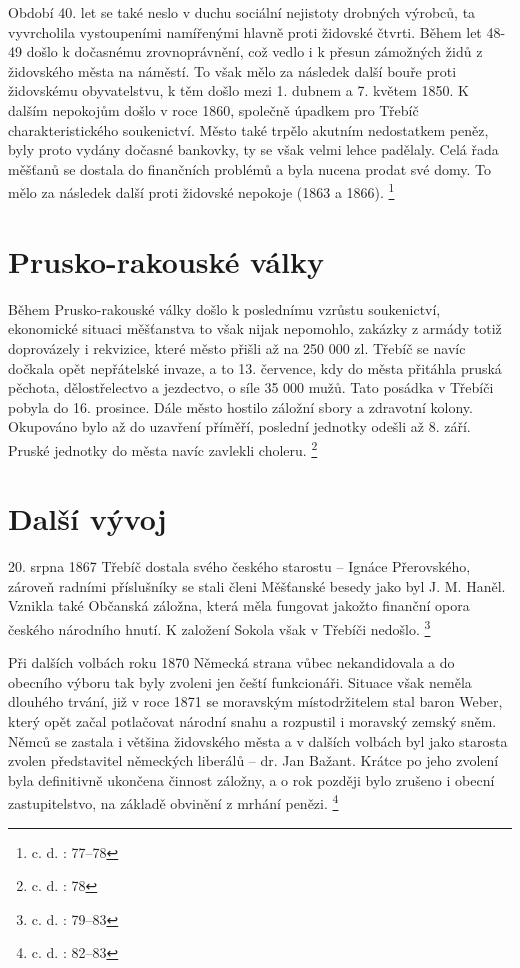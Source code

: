 \documentclass[a4paper,oneside,12p]{report}
\begin{document}
Období 40. let se také neslo v duchu sociální nejistoty drobných výrobců, ta vyvrcholila vystoupeními namířenými hlavně proti židovské čtvrti.
Během let 48-49 došlo k dočasnému zrovnoprávnění, což vedlo i k přesun zámožných židů z židovského města na náměstí.
To však mělo za následek další bouře proti židovskému obyvatelstvu, k těm došlo mezi 1. dubnem a 7. květem 1850.
K dalším nepokojům došlo v roce 1860, společně úpadkem pro Třebíč charakteristického soukenictví.
Město také trpělo akutním nedostatkem peněz, byly proto vydány dočasné bankovky, ty se však velmi lehce padělaly.
Celá řada měšťanů se dostala do finančních problémů a byla nucena prodat své domy.
To mělo za následek další proti židovské nepokoje (1863 a 1866). \footnote{c. d. : 77--78}

\section{Prusko-rakouské války}

Během Prusko-rakouské války došlo k poslednímu vzrůstu soukenictví, ekonomické situaci měšťanstva to však nijak nepomohlo, zakázky z armády totiž doprovázely i rekvizice, které město přišli až na 250 000 zl.
Třebíč se navíc dočkala opět nepřátelské invaze, a to 13. července, kdy do města přitáhla pruská pěchota, dělostřelectvo a jezdectvo, o síle 35 000 mužů.
Tato posádka v Třebíči pobyla do 16. prosince.
Dále město hostilo záložní sbory a zdravotní kolony.
Okupováno bylo až do uzavření příměří, poslední jednotky odešli až 8. září.
Pruské jednotky do města navíc zavlekli choleru. \footnote{c. d. : 78}

\section{Další vývoj}

20. srpna 1867 Třebíč dostala svého českého starostu -- Ignáce Přerovského, zároveň radními příslušníky se stali členi Měšťanské besedy jako byl J. M. Haněl.
Vznikla také Občanská záložna, která měla fungovat jakožto finanční opora českého národního hnutí.
K založení Sokola však v Třebíči nedošlo. \footnote{c. d. : 79--83}

Při dalších volbách roku 1870 Německá strana vůbec nekandidovala a do obecního výboru tak byly zvoleni jen čeští funkcionáři.
Situace však neměla dlouhého trvání, již v roce 1871 se moravským místodržitelem stal baron Weber, který opět začal potlačovat národní snahu a rozpustil i moravský zemský sněm.
Němců se zastala i většina židovského města a v dalších volbách byl jako starosta zvolen představitel německých liberálů -- dr. Jan Bažant.
Krátce po jeho zvolení byla definitivně ukončena činnost záložny, a o rok později bylo zrušeno i obecní zastupitelstvo, na základě obvinění z mrhání penězi. \footnote{c. d. : 82--83}
\end{document}

